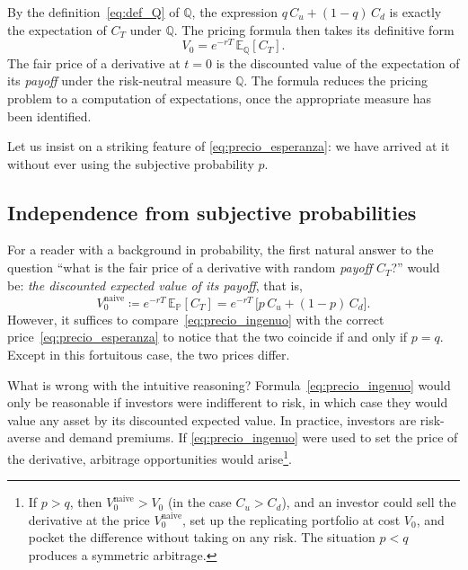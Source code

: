 \documentclass[11pt,a4paper,oneside]{report}
\theoremstyle{plain}
\theoremstyle{definition}
\theoremstyle{remark}
\newcommand{\E}{\mathbb{E}}
\newcommand{\PP}{\mathbb{P}}
\newcommand{\Q}{\mathbb{Q}}
\newcommand{\1}{\mathbf{1}}
\newcommand{\eqdef}{\coloneqq}
\begin{document}
By
the definition~\eqref{eq:def_Q} of $\Q$, the expression
$q\, C_u + (1-q)\, C_d$ is exactly the expectation of $C_T$ under
$\Q$. The pricing formula then takes its definitive form
\begin{equation}\label{eq:precio_esperanza}
  \boxed{\,V_0 = e^{-rT}\, \E_{\Q}[C_T].\,}
\end{equation}
The fair price of a derivative at $t = 0$ is the discounted value of
the expectation of its \emph{payoff} under the risk-neutral measure
$\Q$. The formula reduces the pricing problem to a computation of
expectations, once the appropriate measure has been identified.

Let us insist on a striking feature of
\eqref{eq:precio_esperanza}: we have arrived at it without ever using
the subjective probability $p$.

\subsection{Independence from subjective probabilities}
\label{subsec:indep_subjetiva}

For a reader with a
background in probability, the first natural answer to the question
``what is the fair price of a derivative with random \emph{payoff}
$C_T$?'' would be: \emph{the discounted expected value of its
\emph{payoff}}, that is,
\begin{equation}\label{eq:precio_ingenuo}
  V_0^{\text{naive}} \eqdef e^{-rT}\, \E_{\PP}[C_T]
                  = e^{-rT}\,\bigl[p\, C_u + (1-p)\, C_d\bigr].
\end{equation}
However, it suffices to compare~\eqref{eq:precio_ingenuo} with the
correct price~\eqref{eq:precio_esperanza} to notice that the two
coincide if and only if $p = q$. Except in this fortuitous case, the
two prices differ.

What is wrong with the intuitive reasoning?
Formula~\eqref{eq:precio_ingenuo} would only be reasonable if
investors were indifferent to risk, in which case they would value any
asset by its discounted expected value. In practice, investors are
risk-averse and demand premiums. If \eqref{eq:precio_ingenuo} were
used to set the price of the derivative, arbitrage opportunities would
arise\footnote{If $p > q$, then $V_0^{\text{naive}} > V_0$ (in the
case $C_u > C_d$), and an investor could sell the derivative at the
price $V_0^{\text{naive}}$, set up the replicating portfolio at cost
$V_0$, and pocket the difference without taking on any risk. The
situation $p < q$ produces a symmetric arbitrage.}.
\end{document}
